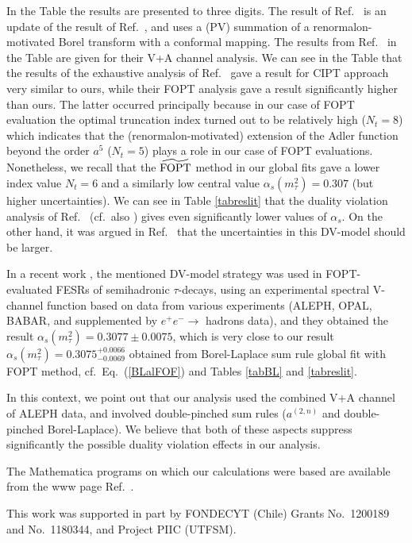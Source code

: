 \documentclass[aps,nofootinbib,showkeys,noshowpacs,preprintnumbers,amsmath,amssymb]{revtex4}
\begin{document}
In the Table the results are presented to three digits.
The result of Ref.~\cite{Caprini2020} is an update of the result of Ref.~\cite{CF2}, and uses a (PV) summation of a renormalon-motivated Borel transform with a conformal mapping. The results from Ref.~\cite{Davetal} in the Table are given for their V+A channel analysis. We can see in the Table that the results of the exhaustive analysis of Ref.~\cite{Pich} gave a result for CIPT approach very similar to ours, while their FOPT analysis gave a result significantly higher than ours. The latter occurred principally because in our case of FOPT evaluation the optimal truncation index turned out to be relatively high ($N_t=8$) which indicates that the (renormalon-motivated) extension of the Adler function beyond the order $a^5$ ($N_t=5$) plays a role in our case of FOPT evaluations. Nonetheless, we recall that the ${\widetilde {\rm FOPT}}$ method in our global fits gave a lower index value $N_t=6$ and a similarly low central value $\alpha_s(m_{\tau}^2)=0.307$ (but higher uncertainties). We can see in Table \ref{tabreslit} that the duality violation analysis of Ref.~\cite{Bo2015} (cf.~also \cite{Bo2011,PerisPC1,Bo2017}) gives even significantly lower values of $\alpha_s$. On the other hand, it was argued in Ref.~\cite{Pich} that the uncertainties in this DV-model should be larger.

In a recent work \cite{Bo2021}, the mentioned DV-model strategy was used in FOPT-evaluated FESRs of semihadronic $\tau$-decays, using an experimental spectral V-channel function based on data from various experiments (ALEPH, OPAL, BABAR, and supplemented by $e^+ e^- \to$ hadrons data), and they obtained the result $\alpha_s(m_{\tau}^2) = 0.3077 \pm 0.0075$, which is very close to our result $\alpha_s(m_{\tau}^2) = 0.3075^{+0.0066}_{-0.0069}$ obtained from Borel-Laplace sum rule global fit with FOPT method, cf.~Eq.~(\ref{BLalFOF}) and Tables \ref{tabBL} and \ref{tabreslit}.

In this context, we point out that our analysis used the combined V+A channel of ALEPH data, and involved double-pinched sum rules ($a^{(2,n)}$ and double-pinched Borel-Laplace). We believe that both of these aspects suppress significantly the possible duality violation effects in our analysis. 

The Mathematica programs on which our calculations were based are available from the www page Ref.~\cite{prgs}.


\begin{acknowledgments}
This work was supported in part by FONDECYT (Chile) Grants No.~1200189 and No.~1180344, and Project PIIC (UTFSM). 
\end{acknowledgments}
\end{document}
